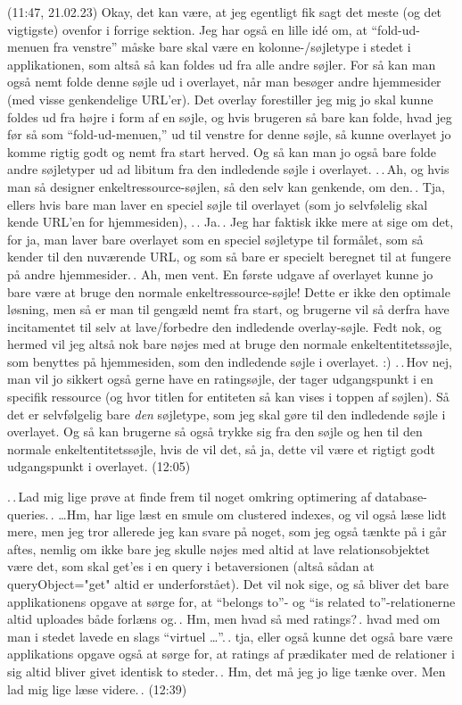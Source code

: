 \documentclass{report}
\begin{document}
(11:47, 21.02.23) Okay, det kan være, at jeg egentligt fik sagt det meste (og det vigtigste) ovenfor i forrige sektion. Jeg har også en lille idé om, at ``fold-ud-menuen fra venstre'' måske bare skal være en kolonne-/søjletype i stedet i applikationen, som altså så kan foldes ud fra alle andre søjler. For så kan man også nemt folde denne søjle ud i overlayet, når man besøger andre hjemmesider (med visse genkendelige URL'er). Det overlay forestiller jeg mig jo skal kunne foldes ud fra højre i form af en søjle, og hvis brugeren så bare kan folde, hvad jeg før så som ``fold-ud-menuen,'' ud til venstre for denne søjle, så kunne overlayet jo komme rigtig godt og nemt fra start herved. Og så kan man jo også bare folde andre søjletyper ud ad libitum fra den indledende søjle i overlayet. .\,.\,Ah, og hvis man så designer enkeltressource-søjlen, så den selv kan genkende, om den.\,. Tja, ellers hvis bare man laver en speciel søjle til overlayet (som jo selvfølelig skal kende URL'en for hjemmesiden), .\,. Ja.\,. Jeg har faktisk ikke mere at sige om det, for ja, man laver bare overlayet som en speciel søjletype til formålet, som så kender til den nuværende URL, og som så bare er specielt beregnet til at fungere på andre hjemmesider.\,. Ah, men vent. En første udgave af overlayet kunne jo bare være at bruge den normale enkeltressource-søjle! Dette er ikke den optimale løsning, men så er man til gengæld nemt fra start, og brugerne vil så derfra have incitamentet til selv at lave/forbedre den indledende overlay-søjle. Fedt nok, og hermed vil jeg altså nok bare nøjes med at bruge den normale enkeltentitetssøjle, som benyttes på hjemmesiden, som den indledende søjle i overlayet. :) .\,.\,Hov nej, man vil jo sikkert også gerne have en ratingsøjle, der tager udgangspunkt i en specifik ressource (og hvor titlen for entiteten så kan vises i toppen af søjlen). Så det er selvfølgelig bare \emph{den} søjletype, som jeg skal gøre til den indledende søjle i overlayet. Og så kan brugerne så også trykke sig fra den søjle og hen til den normale enkeltentitetssøjle, hvis de vil det, så ja, dette vil være et rigtigt godt udgangspunkt i overlayet. (12:05)

.\,.\,Lad mig lige prøve at finde frem til noget omkring optimering af database-queries.\,. 
\ldots Hm, har lige læst en smule om clustered indexes, og vil også læse lidt mere, men jeg tror allerede jeg kan svare på noget, som jeg også tænkte på i går aftes, nemlig om ikke bare jeg skulle nøjes med altid at lave relationsobjektet være det, som skal get'es i en query i betaversionen (altså sådan at queryObject="get" altid er underforstået). Det vil nok sige, og så bliver det bare applikationens opgave at sørge for, at ``belongs to''- og ``is related to''-relationerne altid uploades både forlæns og.\,. Hm, men hvad så med ratings?\,. hvad med om man i stedet lavede en slags ``virtuel \ldots''.\,. tja, eller også kunne det også bare være applikations opgave også at sørge for, at ratings af prædikater med de relationer i sig altid bliver givet identisk to steder.\,. Hm, det må jeg jo lige tænke over. Men lad mig lige læse videre.\,. (12:39)
\end{document}
